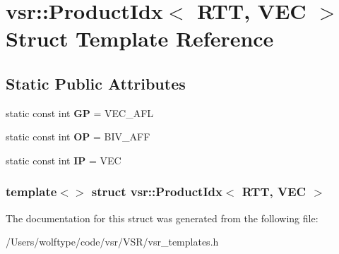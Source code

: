 \hypertarget{structvsr_1_1_product_idx_3_01_r_t_t_00_01_v_e_c_01_4}{\section{vsr\-:\-:Product\-Idx$<$ R\-T\-T, V\-E\-C $>$ Struct Template Reference}
\label{structvsr_1_1_product_idx_3_01_r_t_t_00_01_v_e_c_01_4}
}
\subsection*{Static Public Attributes}
\begin{DoxyCompactItemize}
\item 
\hypertarget{structvsr_1_1_product_idx_3_01_r_t_t_00_01_v_e_c_01_4_aee678aff58f47a1079a47ae0e338c42a}{static const int {\bfseries G\-P} = V\-E\-C\-\_\-\-A\-F\-L}\label{structvsr_1_1_product_idx_3_01_r_t_t_00_01_v_e_c_01_4_aee678aff58f47a1079a47ae0e338c42a}

\item 
\hypertarget{structvsr_1_1_product_idx_3_01_r_t_t_00_01_v_e_c_01_4_aae4ce9d5e1910ab535c336d23ec0ba4f}{static const int {\bfseries O\-P} = B\-I\-V\-\_\-\-A\-F\-F}\label{structvsr_1_1_product_idx_3_01_r_t_t_00_01_v_e_c_01_4_aae4ce9d5e1910ab535c336d23ec0ba4f}

\item 
\hypertarget{structvsr_1_1_product_idx_3_01_r_t_t_00_01_v_e_c_01_4_aa11a06f8840de83fe979d5209635413b}{static const int {\bfseries I\-P} = V\-E\-C}\label{structvsr_1_1_product_idx_3_01_r_t_t_00_01_v_e_c_01_4_aa11a06f8840de83fe979d5209635413b}

\end{DoxyCompactItemize}
\subsubsection*{template$<$$>$ struct vsr\-::\-Product\-Idx$<$ R\-T\-T, V\-E\-C $>$}



The documentation for this struct was generated from the following file\-:\begin{DoxyCompactItemize}
\item 
/\-Users/wolftype/code/vsr/\-V\-S\-R/vsr\-\_\-templates.\-h\end{DoxyCompactItemize}
